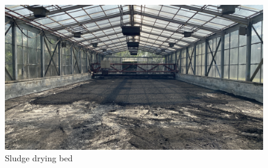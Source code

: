 \begin{figure}[H]
\centering
\includegraphics[width=1\linewidth]{material_and_methodology/Sludge Drying bed.jpg}


\caption{Sludge drying bed}
\label{fig:Sludge_Drying_Bed}
\end{figure}
